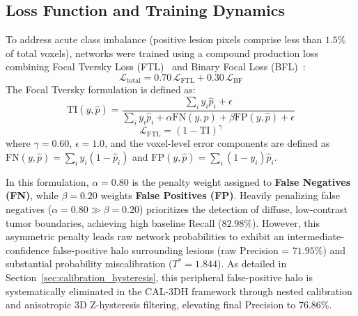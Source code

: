 \documentclass[preprint,12pt,authoryear]{elsarticle}
\begin{document}
\subsection{Loss Function and Training Dynamics}
To address acute class imbalance (positive lesion pixels comprise less than $1.5\%$ of total voxels), networks were trained using a compound production loss combining Focal Tversky Loss (FTL)~\citep{salehi2017tversky,abraham2019novel} and Binary Focal Loss (BFL)~\citep{lin2017focal}:
\begin{equation}
\mathcal{L}_{\text{total}} = 0.70\,\mathcal{L}_{\text{FTL}} + 0.30\,\mathcal{L}_{\text{BF}}
\end{equation}
The Focal Tversky formulation is defined as:
\begin{equation}
\text{TI}(y, \hat{p}) = \frac{\sum_i y_i \hat{p}_i + \epsilon}{\sum_i y_i \hat{p}_i + \alpha \text{FN}(y, \hat{p}) + \beta \text{FP}(y, \hat{p}) + \epsilon}
\end{equation}
\begin{equation}
\mathcal{L}_{\text{FTL}} = (1 - \text{TI})^\gamma
\end{equation}
where $\gamma = 0.60$, $\epsilon = 1.0$, and the voxel-level error components are defined as $\text{FN}(y, \hat{p}) = \sum_i y_i(1 - \hat{p}_i)$ and $\text{FP}(y, \hat{p}) = \sum_i (1 - y_i)\hat{p}_i$.

In this formulation, $\alpha = 0.80$ is the penalty weight assigned to \textbf{False Negatives (FN)}, while $\beta = 0.20$ weights \textbf{False Positives (FP)}. Heavily penalizing false negatives ($\alpha = 0.80 \gg \beta = 0.20$) prioritizes the detection of diffuse, low-contrast tumor boundaries, achieving high baseline Recall ($82.98\%$). However, this asymmetric penalty leads raw network probabilities to exhibit an intermediate-confidence false-positive halo surrounding lesions (raw Precision = $71.95\%$) and substantial probability miscalibration ($T^* = 1.844$). As detailed in Section~\ref{sec:calibration_hysteresis}, this peripheral false-positive halo is systematically eliminated in the CAL-3DH framework through nested calibration and anisotropic 3D Z-hysteresis filtering, elevating final Precision to $76.86\%$.
\end{document}
